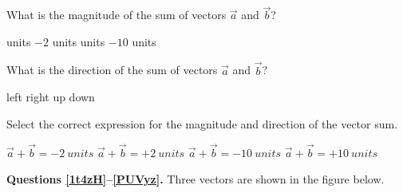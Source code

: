 \documentclass[]{exam}
\begin{document}
\begin{center}
\end{center}

\begin{questions}

\question \label{v9nAV}
What is the magnitude of the sum of vectors $\vec{a}$ and $\vec{b}$?

\begin{randomizechoices}
     units
    \choice $-2$ units
     units
    \choice $-10$ units
\end{randomizechoices}

\question 
What is the direction of the sum of vectors $\vec{a}$ and $\vec{b}$?

\begin{randomizechoices}
    \correctchoice left
    \choice right
    \choice up
    \choice down
\end{randomizechoices}

\question \label{zpPP8}
Select the correct expression for the magnitude and direction of the vector sum.

\begin{randomizechoices}
    \correctchoice $\vec{a} + \vec{b} = \SI{-2}{units}$
    \choice $\vec{a} + \vec{b} = +\SI{2}{units}$
    \choice $\vec{a} + \vec{b} = \SI{-10}{units}$
    \choice $\vec{a} + \vec{b} = +\SI{10}{units}$
\end{randomizechoices}

\begin{EnvUplevel}
\textbf{Questions \ref{1t4zH}--\ref{PUVyz}.} Three vectors are shown in the figure below.

\begin{center}
\end{center}    
\end{EnvUplevel}


\end{questions}
\end{document}
